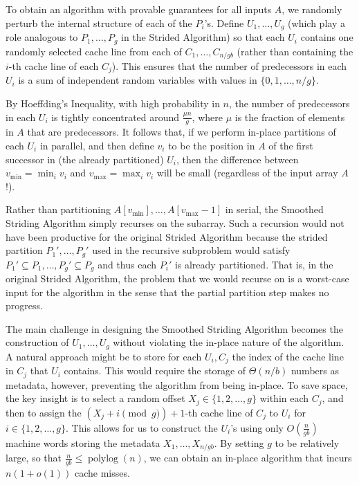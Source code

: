 \documentclass[sigconf, 10pt, nonacm]{acmart}
\renewcommand{\paragraph}[1]{\vspace{0.09in}\noindent{\bf \boldmath #1.}}
\theoremstyle{remark}
\theoremstyle{remark}
\begin{document}
\paragraph{The Smoothed Striding Algorithm}
To obtain an algorithm with provable guarantees for all inputs $A$, we
randomly perturb the internal structure of each of the $P_i$'s. Define
$U_1, \ldots, U_{g}$ (which play a role analogous to $P_1,
\ldots, P_g$ in the Strided Algorithm) so that each $U_i$ contains one
randomly selected cache line from each of $C_1, \ldots, C_{n /
  gb}$ (rather than containing the $i$-th cache line of each
$C_j$). This ensures that the number of predecessors in each $U_i$ is
a sum of independent random variables with values in $\{0, 1, \ldots,
n/g\}$.

By Hoeffding's Inequality, with high probability in $n$, the number of
predecessors in each $U_i$ is tightly concentrated around $\frac{\mu
  n}{g}$, where $\mu$ is the fraction of elements in $A$ that are
predecessors. It follows that, if we perform in-place partitions of
each $U_i$ in parallel, and then define $v_i$ to be the position in
$A$ of the first successor in (the already partitioned) $U_i$, then
the difference between $v_{\text{min}} = \min_i v_i$ and
$v_{\text{max}} = \max_i v_i$ will be small (regardless of the input array
$A$!).

Rather than partitioning $A[v_{\text{min}}],\ldots,
A[v_{\text{max}}-1]$ in serial, the Smoothed Striding Algorithm simply
recurses on the subarray. Such a recursion would not have been
productive for the original Strided Algorithm because the strided
partition $P_1', \ldots, P_g'$ used in the recursive subproblem would
satisfy $P_1' \subseteq P_1, \ldots, P_g' \subseteq P_g$ and thus each
$P_i'$ is already partitioned. That is, in the original Strided
Algorithm, the problem that we would recurse on is a worst-case input
for the algorithm in the sense that the partial partition step makes
no progress.


The main challenge in designing the Smoothed Striding Algorithm
becomes the construction of $U_1, \ldots, U_{g}$ without
violating the in-place nature of the algorithm. A natural approach
might be to store for each $U_i, C_j$ the index of the cache
line in $C_j$ that $U_i$ contains. This would require the storage of
$\Theta(n / b)$ numbers as metadata, however, preventing the algorithm
from being in-place. To save space, the key insight is to select a
random offset $X_j \in \{1, 2, \ldots, g\}$ within each $C_j$, and
then to assign the $(X_j + i \pmod g) + 1$-th cache line of $C_j$ to
$U_i$ for $i \in \{1, 2, \ldots, g\}$. This allows for us to construct
the $U_i$'s using only $O\left(\frac{n}{gb}\right)$ machine words
storing the metadata $X_1, \ldots, X_{n / gb}$. By setting $g$ to
be relatively large, so that $\frac{n}{gb} \le
\operatorname{polylog}(n)$, we can obtain an in-place algorithm that
incurs $n (1 + o(1))$ cache misses.
\end{document}

